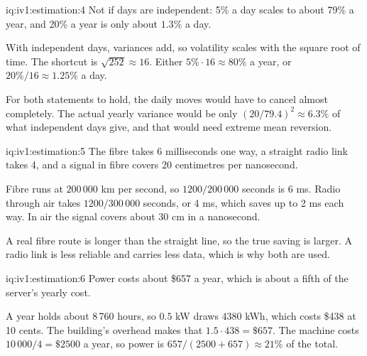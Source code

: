 \begin{solution}{iq:iv1:estimation:4}
Not if days are independent: 5\% a day scales to about 79\% a year, and 20\% a year is only about $1.3\%$ a day.

With independent days, variances add, so volatility scales with the square root of time. The shortcut is $\sqrt{252} \approx 16$. Either $5\% \cdot 16 \approx 80\%$ a year, or $20\%/16 \approx 1.25\%$ a day.

For both statements to hold, the daily moves would have to cancel almost completely. The actual yearly variance would be only $(20/79.4)^2 \approx 6.3\%$ of what independent days give, and that would need extreme mean reversion.

\end{solution}

\begin{solution}{iq:iv1:estimation:5}
The fibre takes 6 milliseconds one way, a straight radio link takes 4, and a signal in fibre covers 20 centimetres per nanosecond.

Fibre runs at $200\,000$ km per second, so $1200/200\,000$ seconds is 6 ms. Radio through air takes $1200/300\,000$ seconds, or 4 ms, which saves up to 2 ms each way. In air the signal covers about 30 cm in a nanosecond.

A real fibre route is longer than the straight line, so the true saving is larger. A radio link is less reliable and carries less data, which is why both are used.

\end{solution}

\begin{solution}{iq:iv1:estimation:6}
Power costs about \$657 a year, which is about a fifth of the server's yearly cost.

A year holds about 8\,760 hours, so $0.5$ kW draws $4380$ kWh, which costs \$438 at 10 cents. The building's overhead makes that $1.5 \cdot 438 = \$657$. The machine costs $10\,000/4 = \$2500$ a year, so power is $657/(2500 + 657) \approx 21\%$ of the total.

\end{solution}


